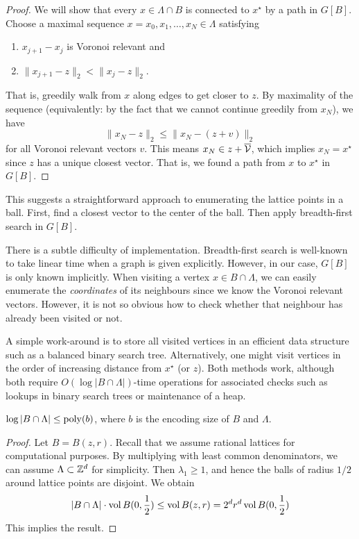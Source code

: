 \begin{proof}
  We will show that every $x \in \Lambda \cap B$ is connected to $x^\star$ by a path in $G[B]$.
  Choose a maximal sequence $x = x_0, x_1, \ldots, x_N \in \Lambda$ satisfying
  \begin{enumerate}
    \item $x_{j+1} - x_j$ is Voronoi relevant and
    \item $\|x_{j+1} - z\|_2 < \|x_j - z\|_2$.
  \end{enumerate}
  That is, greedily walk from $x$ along edges to get closer to $z$.
  By maximality of the sequence (equivalently: by the fact that we cannot continue greedily from $x_N$), we have
  \[
    \|x_N - z\|_2 \leq \|x_N - (z + v)\|_2
  \]
  for all Voronoi relevant vectors $v$.
  This means $x_N \in z + \overline{\mathcal{V}}$,
  which implies $x_N = x^\star$ since $z$ has a unique closest vector.
  That is, we found a path from $x$ to $x^\star$ in $G[B]$.
\end{proof}

This suggests a straightforward approach to enumerating the lattice points in a ball.
First, find a closest vector to the center of the ball.
Then apply breadth-first search in $G[B]$.

There is a subtle difficulty of implementation.
Breadth-first search is well-known to take linear time when a graph is given explicitly.
However, in our case, $G[B]$ is only known implicitly.
When visiting a vertex $x \in B \cap \Lambda$,
we can easily enumerate the \emph{coordinates} of its neighbours since we know the Voronoi relevant vectors.
However, it is not so obvious how to check whether that neighbour has already been visited or not.

A simple work-around is to store all visited vertices in an efficient data structure
such as a balanced binary search tree.
Alternatively, one might visit vertices in the order of increasing distance from $x^\star$ (or $z$).
Both methods work,
although both require $O(\log |B \cap \Lambda|)$-time operations for associated checks
such as lookups in binary search trees or maintenance of a heap.

\begin{lemma}
  $\log |B \cap \Lambda| \leq \operatorname{poly}(b)$,
  where $b$ is the encoding size of $B$ and $\Lambda$.
\end{lemma}
\begin{proof}
  Let $B = B(z,r)$.
  Recall that we assume rational lattices for computational purposes.
  By multiplying with least common denominators, we can assume $\Lambda \subset \mathbb{Z}^d$ for simplicity.
  Then $\lambda_1 \geq 1$, and hence the balls of radius $1/2$ around lattice points are disjoint.
  We obtain
  \[
    |B \cap \Lambda| \cdot \operatorname{vol} B(0,\frac{1}{2}) \leq \operatorname{vol} B(z,r) = 2^d r^d \operatorname{vol} B(0,\frac{1}{2})
  \]
  This implies the result.
\end{proof}

